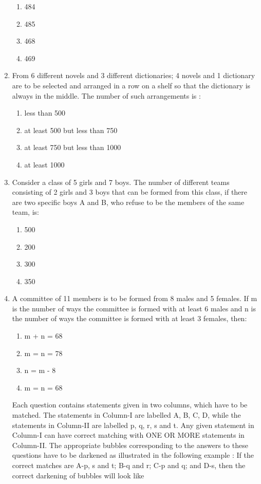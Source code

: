 \documentclass[journal,12pt,twocolumn]{IEEEtran}
\begin{document}
\begin{enumerate}
\begin{enumerate}
\item 484
\item 485
\item 468
\item 469\\
\end{enumerate}
\item From 6 different novels and 3 different dictionaries; 4 novels and 1 dictionary are to be selected and arranged in a row on a shelf so that the dictionary is always in the middle. The number of such arrangements is :
\begin{enumerate}
\item less than 500
\item at least 500 but less than 750
\item at least 750 but less than 1000
\item at least 1000\\ 
\end{enumerate}
\item Consider a class of 5 girls and 7 boys. The number of different teams consisting of 2 girls and 3 boys that can be formed from this class, if there are two specific boys A and B, who refuse to be the members of the same team, is:
\begin{enumerate}
\item 500
\item 200
\item 300
\item 350\\
\end{enumerate} 
\item A committee of 11 members is to be formed from 8 males and 5 females. If m is the number of ways the committee is formed with at least 6 males and n is the number of ways the committee is formed with at least 3 females, then:
\begin{enumerate}
\item m + n = 68
\item m = n = 78
\item n = m - 8
\item m = n = 68\\
\end{enumerate}


Each question contains statements given in two columns, which have to be matched. The statements in Column-I are labelled A, B, C, D, while the statements in Column-II are labelled p, q, r, s and t. Any given statement in Column-I can have correct matching with ONE OR MORE statements in Column-II. The appropriate bubbles corresponding to the answers to these questions have to be darkened as illustrated in the following example :
If the correct matches are A-p, s and t; B-q and r; C-p and q; and D-s, then the correct darkening of bubbles will look like


\end{enumerate}
\end{document}
